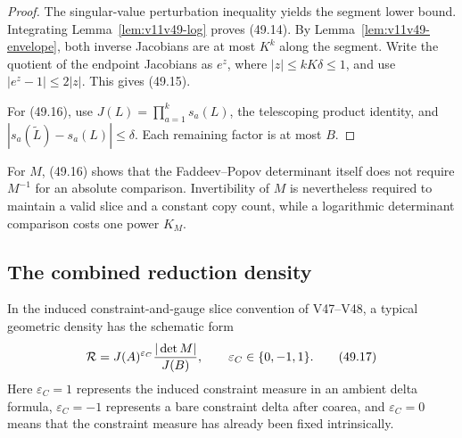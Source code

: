 \documentclass[11pt]{article}
\begin{document}
\begin{proof}
The singular-value perturbation inequality yields the segment lower
bound.  Integrating Lemma~\ref{lem:v11v49-log} proves (49.14).
By Lemma~\ref{lem:v11v49-envelope}, both inverse Jacobians are at most
\(K^k\) along the segment.  Write the quotient of the endpoint
Jacobians as \(e^z\), where \(|z|\le kK\delta\le1\), and use
\(|e^z-1|\le2|z|\).  This gives (49.15).

For (49.16), use
\(J(L)=\prod_{a=1}^k s_a(L)\), the telescoping product identity, and
\(|s_a(\widetilde L)-s_a(L)|\le\delta\).  Each remaining factor is at
most \(B\).
\end{proof}

For \(M\), (49.16) shows that the Faddeev--Popov determinant itself
does not require \(M^{-1}\) for an absolute comparison.  Invertibility
of \(M\) is nevertheless required to maintain a valid slice and a
constant copy count, while a logarithmic determinant comparison costs
one power \(K_M\).

\subsection{The combined reduction density}

In the induced constraint-and-gauge slice convention of V47--V48, a
typical geometric density has the schematic form
\[
                  {\cal R}
     =J(A)^{\varepsilon_C}
       \frac{|\det M|}{J(B)},\qquad
                  \varepsilon_C\in\{0,-1,1\}.                 \tag{49.17}
\]
Here \(\varepsilon_C=1\) represents the induced constraint measure in
an ambient delta formula, \(\varepsilon_C=-1\) represents a bare
constraint delta after coarea, and \(\varepsilon_C=0\) means that the
constraint measure has already been fixed intrinsically.
\end{document}
